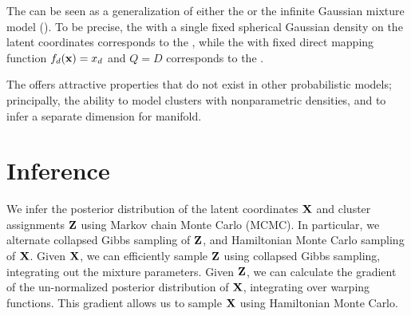 The \iwmm{} can be seen as a generalization of either the \gplvm{} or the infinite Gaussian mixture model (\iGMM{}).
To be precise, the \iwmm{} with a single fixed spherical Gaussian density on the latent coordinates corresponds to the \gplvm{}, while the \iwmm{} with fixed direct mapping function $f_{d}({\bf{x}})=x_{d}$ and 
$Q=D$ corresponds to the \iGMM{}.

The \iwmm{} offers attractive properties that do not exist in other probabilistic models; principally, the ability to model clusters with nonparametric densities, and to infer a separate dimension for manifold.





\section{Inference}

We infer the posterior distribution of the latent coordinates $\mathbf{X}$ and cluster assignments $\mathbf{Z}$ using Markov chain Monte Carlo (MCMC).
In particular, we alternate collapsed Gibbs sampling of $\mathbf{Z}$, and Hamiltonian Monte Carlo sampling of $\mathbf{X}$.
Given $\mathbf{X}$,
we can efficiently sample $\mathbf{Z}$ using collapsed Gibbs sampling, integrating out the mixture parameters.
Given $\mathbf{Z}$, we can calculate the gradient of the un-normalized posterior distribution of $\mathbf{X}$, integrating over warping functions.
This gradient allows us to sample $\mathbf{X}$ using Hamiltonian Monte Carlo.

